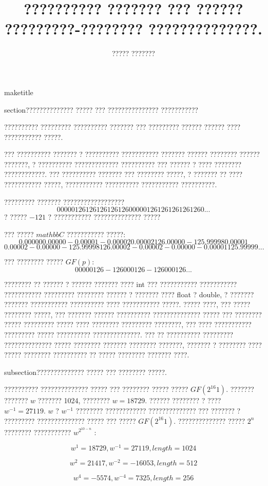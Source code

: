 \documentclass[11pt]{article} %
\title{?????????? ??????? ??? ?????? ?????????-???????? ??????????????.}
\author{????? ???????}
\begin{document}
maketitle

section{?????????????? ????? ??? ??????????????? ???????????}

?????????? ????????? ?????????? ??????? ??? ????????? ?????? ?????? ???? ??????????? ?????.

??? ?????????? ??????? ? ?????????? ??????????? ??????? ?????? ???????? ?????? ???????, ? ?????????? ????????????? ?????????? ???
?????? ? ???? ???????? ????????????. ??? ?????????? ??????? ??? ???????? ?????, ? ??????? ?? ???? ??????????? ?????, ??????????? ?????????? ??????????? ??????????.

????????? ??????? ??????????????????
$$ 0 0 0 0 0 126 126 126 126 126 0 0 0 0 0 126 126 126 126 126 0 ...$$
? ????? $-1 2 1$ ? ??????????? ?????????????? ?????

??? ????? $mathbb{C}$ ??????????? ?????:
$$ 0.00000 0.00000 -0.00001 -0.00002 0.00002 126.00000 -125.99998 0.00001 $$
$$ 0.00002 -0.00000 -125.99998 126.00002 -0.00002 -0.00000 -0.00001 125.99999 ...$$

??? ???????? ????? $GF(p)$:
$$ 0 0 0 0 0 126 -126 0 0 0 126 -126 0 0 0 126 ...$$

???????? ?? ?????? ? ?????? ??????? ???? int ??? ??????????? ??????????? ??????????? ????????? ???????? ??????
? ??????? ???? float ? double, ? ??????? ??????? ??????????? ?????????? ???? ??????????? ?????. ????? ????, ??? ????? ???????? ?????, ??? ??????? ?????? ?????????? ??????????????
????? ??? ???????? ????? ????????? ????? ???? ???????? ????????? ????????, ??? ???? ??????????? ????????? ????? ?????????? ??????????????. ??? ?? ?????????? ????????? ??????????????
????? ???????? ??????? ???????? ???????, ??????? ? ???????? ???? ????? ???????? ?????????? ?? ????? ???????? ??????? ????.



subsection{?????????????? ????? ??? ???????? ?????.}

?????????? ?????????????? ????? ??? ???????? ????? ????? $GF(2^{16} 1)$. ??????? ??????? $w$ ??????? 1024, ???????? $w=18729$. ?????? ???????? ? ???? $w^{-1}=27119$.
$w$ ? $w^{-1}$ ???????? ???????????? ?????????????? ??? ??????? ? ????????? ?????????????? ????? ??? ????? $GF(2^{16} 1)$. ?????????????? ????? $2^n$ ???????? ???????????
$w^{2^{10-n}}$ :

$$w^{1}=18729, w^{-1}=27119, length=1024 $$

$$w^{2}=21417, w^{-2}=-16053, length=512 $$

$$w^{4}=-5574, w^{-4}=7325, length=256 $$
\end{document}

